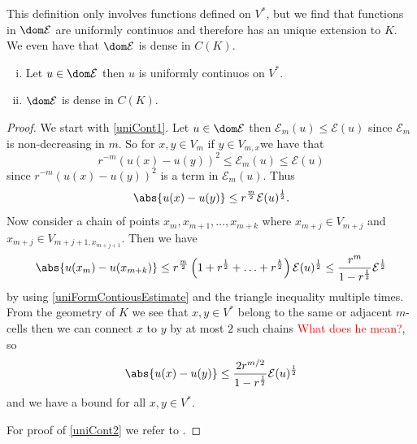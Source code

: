 This definition only involves functions defined on $V^{*}$, but we find that functions in $\dom \mathcal{E}$ are uniformly continuos and therefore has an unique extension to $K$. We even have that $\dom \mathcal{E}$ is dense in $C(K)$.
\begin{prop} \phantom{a}
	\begin{enumerate}[(i)] 
		\item 	Let $u \in \dom \mathcal{E}$ then $u$ is uniformly continuos on $V^{*}$. \label{uniCont1}
		\item $\dom \mathcal{E}$ is dense in $C(K)$. \label{uniCont2}
	\end{enumerate}
\end{prop}
\begin{proof}
	We start with \cref{uniCont1}. Let $u \in \dom \mathcal{E}$ then $\mathcal{E}_m(u) \leq \mathcal{E}(u)$ since $\mathcal{E}_m$ is non-decreasing in $m$. So for $x,y \in V_m$ if $y \in V_{m,x}$we have that
	\begin{equation}\label{uniFormContiousEstimate}
		r^{-m}(u(x) -u(y))^{2} \leq \mathcal{E}_m(u) \leq \mathcal{E}(u)
	\end{equation}
	since $r^{-m}(u(x) -u(y))^{2}$ is a term in $\mathcal{E}_m(u)$. Thus
	\begin{equation}
		\abs{u(x)-u(y)} \leq r^{\frac{m}{2}} \mathcal{E}(u)^{\frac{1}{2}}.
	\end{equation}
	Now consider a chain of points $x_m, x_{m+1}, \ldots, x_{m+k}$ where $x_{m+j} \in V_{m+j}$ and $x_{m+j} \in V_{m+j+1, x_{m+j+1}}$. Then we have
	\begin{equation}
		\abs{u(x_m)-u(x_{m+k})} \leq r^{\frac{m}{2}}\left(1 + r^{\frac{1}{2}} + \ldots + r^{\frac{k}{2}}\right)\mathcal{E}(u)^{\frac{1}{2}} \leq \frac{r^{m}}{1-r^{\frac{1}{2}}} \mathcal{E}^{\frac{1}{2}}
	\end{equation}
	by using \eqref{uniFormContiousEstimate} and the triangle inequality multiple times. From the geometry of $K$ we see that $x, y \in V^{*}$ belong to the same or adjacent $m$-cells then we can connect $x$ to $y$ by at most $2$ such chains \textcolor{red}{What does he mean?}, so
	\begin{equation}
		\abs{u(x) - u(y)} \leq \frac{2r^{m/2}}{1-r^{\frac{1}{2}}} \mathcal{E}(u)^{\frac{1}{2}}
	\end{equation}
	and we have a bound for all $x,y \in V^{*}$.
	
	For proof of \cref{uniCont2} we refer to \cite{strichartz}.
\end{proof}


